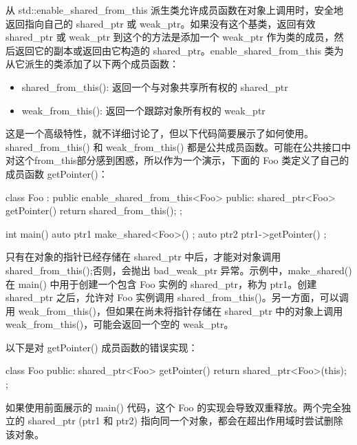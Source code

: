
从 std::enable\_shared\_from\_this 派生类允许成员函数在对象上调用时，安全地返回指向自己的 shared\_ptr 或 weak\_ptr。如果没有这个基类，返回有效 shared\_ptr 或 weak\_ptr 到这个的方法是添加一个 weak\_ptr 作为类的成员，然后返回它的副本或返回由它构造的 shared\_ptr。enable\_shared\_from\_this 类为从它派生的类添加了以下两个成员函数：

\begin{itemize}
\item
shared\_from\_this(): 返回一个与对象共享所有权的 shared\_ptr

\item
weak\_from\_this(): 返回一个跟踪对象所有权的 weak\_ptr
\end{itemize}

这是一个高级特性，就不详细讨论了，但以下代码简要展示了如何使用。shared\_from\_this() 和 weak\_from\_this() 都是公共成员函数。可能在公共接口中对这个from\_this部分感到困惑，所以作为一个演示，下面的 Foo 类定义了自己的成员函数 getPointer()：

\begin{cpp}
class Foo : public enable_shared_from_this<Foo>
{
    public:
        shared_ptr<Foo> getPointer() {
            return shared_from_this();
        }
};

int main()
{
    auto ptr1 { make_shared<Foo>() };
    auto ptr2 { ptr1->getPointer() };
}

\end{cpp}

只有在对象的指针已经存储在 shared\_ptr 中后，才能对对象调用 shared\_from\_this();否则，会抛出 bad\_weak\_ptr 异常。示例中，make\_shared() 在 main() 中用于创建一个包含 Foo 实例的 shared\_ptr，称为 ptr1。创建 shared\_ptr 之后，允许对 Foo 实例调用 shared\_from\_this()。另一方面，可以调用 weak\_from\_this()，但如果在尚未将指针存储在 shared\_ptr 中的对象上调用 weak\_from\_this()，可能会返回一个空的 weak\_ptr。

以下是对 getPointer() 成员函数的错误实现：

\begin{cpp}
class Foo
{
    public:
        shared_ptr<Foo> getPointer() {
            return shared_ptr<Foo>(this);
        }
};
\end{cpp}

如果使用前面展示的 main() 代码，这个 Foo 的实现会导致双重释放。两个完全独立的 shared\_ptr (ptr1 和 ptr2) 指向同一个对象，都会在超出作用域时尝试删除该对象。

